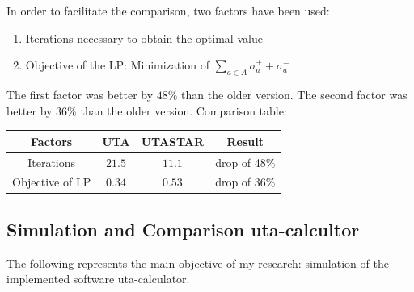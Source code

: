 \documentclass{report}
\begin{document}
In order to facilitate the comparison, two factors have been used:
\begin{enumerate}
\item Iterations necessary to obtain the optimal value
\item Objective of the LP: Minimization of $ \sum_{a \in A} \sigma _{a}^{+} + \sigma _{a}^{-} $ 
\end{enumerate}

The first factor was better by $48\%$ than the older version. The second factor was better by $36\%$ than the older version. 
Comparison table:

\begin{center}
\begin{tabular}{| c | c | c | c |} 
\hline
Factors & UTA & UTASTAR & Result \\
\hline
Iterations & $21.5$ & $11.1$ & drop of 48\% \\ 
\hline
Objective of LP & $0.34$ & $0.53$ & drop of 36\%\\ 
\hline
\end{tabular}
\end{center}

\subsection{Simulation and Comparison uta-calcultor}
The following represents the main objective of my research: simulation of the implemented software uta-calculator. 
\end{document}
